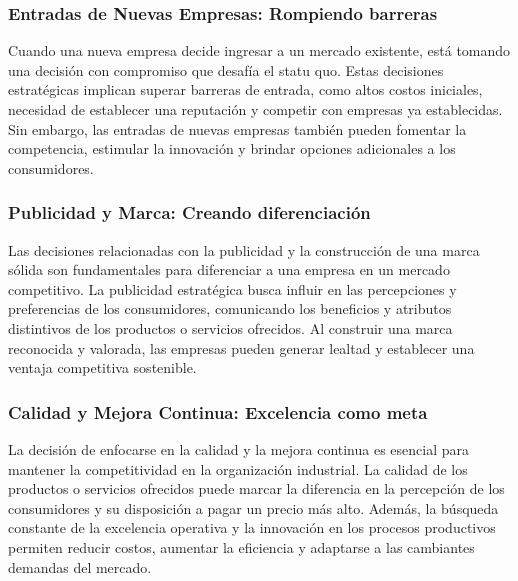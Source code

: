 \documentclass[
  letterpaper,
  DIV=11,
  numbers=noendperiod]{scrartcl}
\begin{document}
\hypertarget{entradas-de-nuevas-empresas-rompiendo-barreras}{%
\subsubsection{Entradas de Nuevas Empresas: Rompiendo
barreras}\label{entradas-de-nuevas-empresas-rompiendo-barreras}}

Cuando una nueva empresa decide ingresar a un mercado existente, está
tomando una decisión con compromiso que desafía el statu quo. Estas
decisiones estratégicas implican superar barreras de entrada, como altos
costos iniciales, necesidad de establecer una reputación y competir con
empresas ya establecidas. Sin embargo, las entradas de nuevas empresas
también pueden fomentar la competencia, estimular la innovación y
brindar opciones adicionales a los consumidores.

\hypertarget{publicidad-y-marca-creando-diferenciaciuxf3n}{%
\subsubsection{Publicidad y Marca: Creando
diferenciación}\label{publicidad-y-marca-creando-diferenciaciuxf3n}}

Las decisiones relacionadas con la publicidad y la construcción de una
marca sólida son fundamentales para diferenciar a una empresa en un
mercado competitivo. La publicidad estratégica busca influir en las
percepciones y preferencias de los consumidores, comunicando los
beneficios y atributos distintivos de los productos o servicios
ofrecidos. Al construir una marca reconocida y valorada, las empresas
pueden generar lealtad y establecer una ventaja competitiva sostenible.

\hypertarget{calidad-y-mejora-continua-excelencia-como-meta}{%
\subsubsection{Calidad y Mejora Continua: Excelencia como
meta}\label{calidad-y-mejora-continua-excelencia-como-meta}}

La decisión de enfocarse en la calidad y la mejora continua es esencial
para mantener la competitividad en la organización industrial. La
calidad de los productos o servicios ofrecidos puede marcar la
diferencia en la percepción de los consumidores y su disposición a pagar
un precio más alto. Además, la búsqueda constante de la excelencia
operativa y la innovación en los procesos productivos permiten reducir
costos, aumentar la eficiencia y adaptarse a las cambiantes demandas del
mercado.
\end{document}
